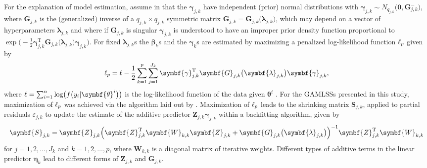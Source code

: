 For the explanation of model estimation, assume in  that the \(\symbf{\gamma}_{j, k}\) have independent (prior) normal distributions with \(\symbf{\gamma}_{j, k} \sim N_{q_{j, k}}\bigl(\symbf{0}, \symbf{G}_{j, k}^-\bigr)\), where \(\symbf{G}_{j, k}^-\) is the (generalized) inverse of a \(q_{j, k} \times q_{j, k}\) symmetric matrix \(\symbf{G}_{j, k} = \symbf{G}_{j, k}\bigl(\symbf{\lambda}_{j, k}\bigr)\), which may depend on a vector of hyperparameters \(\symbf{\lambda}_{j, k}\) and where if \(\symbf{G}_{j, k}\) is singular \(\symbf{\gamma}_{j, k}\) is understood to have an improper prior density function proportional to \(\exp\bigl(-\frac{1}{2} \symbf{\gamma}_{j, k}^{\text{T}} \symbf{G}_{j, k}\bigl(\symbf{\lambda}_{j, k}\bigr) \symbf{\gamma}_{j, k}\bigr)\).  For fixed \(\symbf{\lambda}_{j, k}\)s the \(\symbf{\beta}_k\)s and the \(\symbf{\gamma}_k\)s are estimated by maximizing a penalized log-likelihood function \(\ell_p\) given by
\begin{equation}
  \label{eq:GAMLSSRigbyStasinopoulos2005PenalizedLikelihood}
  \loglikelihood_p = \loglikelihood - \frac{1}{2} \sum_{k = 1}^p \sum_{j = 1}^{J_k} \symbf{\gamma}_{j, k}^{\text{T}} \symbf{G}_{j, k}\bigl(\symbf{\lambda}_{j, k}\bigr) \symbf{\gamma}_{j, k},
\end{equation}
where \(\loglikelihood = \sum_{i = 1}^n \log\bigl(f\bigl(y_i | \symbf{\theta}^i\bigr)\bigr)\) is the log-likelihood function of the data given \(\symbf{\theta}^i\) \parencite{Rigby2005}.  For the GAMLSSs presented in this study, maximization of \(\ell_p\) was achieved via the algorithm laid out by \textcite{Rigby1996}.  Maximization of \(\ell_p\) leads to the shrinking matrix \(\symbf{S}_{j, k}\), applied to partial residuals \(\varepsilon_{j, k}\) to update the estimate of the additive predictor \(\symbf{Z}_{j, k} \symbf{\gamma}_{j, k}\) within a backfitting algorithm, given by
\begin{equation}
  \label{eq:GAMLSSRigbyStasinopoulos2005BackfittingAlgorithm}
  \symbf{S}_{j, k} = \symbf{Z}_{j, k} \Bigl(\symbf{Z}_{j, k}^{\text{T}} \symbf{W}_{k, k} \symbf{Z}_{j, k} + \symbf{G}_{j, k}\bigl(\symbf{\lambda}_{j, k}\bigr)\Bigr)^{-1} \symbf{Z}_{j, k}^{\text{T}} \symbf{W}_{k, k}
\end{equation}
for \(j = 1, 2, \ldots, J_k\) and \(k = 1, 2, \ldots, p\), where \(\symbf{W}_{k, k}\) is a diagonal matrix of iterative weights.  Different types of additive terms in the linear predictor \(\symbf{\eta}_k\) lead to different forms of \(\symbf{Z}_{j, k}\) and \(\symbf{G}_{j, k}\).

